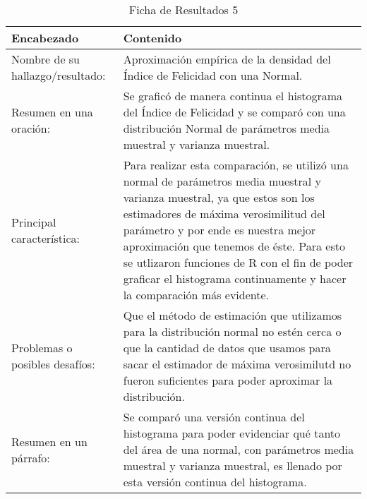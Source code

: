 \begin{table}[H]
    \caption{Ficha de Resultados 5}
    \begin{center}
        \begin{tabular}{  m{3cm} | m{12cm}  }
        \hline
        \textbf{ Encabezado} & \textbf{Contenido } \\ 
        \hline
        Nombre de su hallazgo/resultado: & Aproximación empírica de la densidad del Índice de Felicidad con una Normal.\\ 
        \hline
        Resumen en una oración: & Se graficó de manera continua el histograma del Índice de Felicidad y se comparó con una distribución Normal de parámetros media muestral y varianza muestral.\\ 
        \hline
        Principal característica: & Para realizar esta comparación, se utilizó una normal de parámetros media muestral y varianza muestral, ya que estos son los estimadores de máxima verosimilitud del parámetro y por ende es nuestra mejor aproximación que tenemos de éste. Para esto se utlizaron funciones de R con el fin de poder graficar el histograma continuamente y hacer la comparación más evidente.\\ 
        \hline
        Problemas o posibles desafíos: & Que el método de estimación que utilizamos para la distribución normal no estén cerca o que la cantidad de datos que usamos para sacar el estimador de máxima verosimilutd no fueron suficientes para poder aproximar la distribución.\\ 
        \hline
        Resumen en un párrafo: & Se comparó una versión continua del histograma para poder evidenciar qué tanto del área de una normal, con parámetros media muestral y varianza muestral, es llenado por esta versión continua del histograma.\\ 
        \hline
        \end{tabular}
    \end{center}
\end{table}

